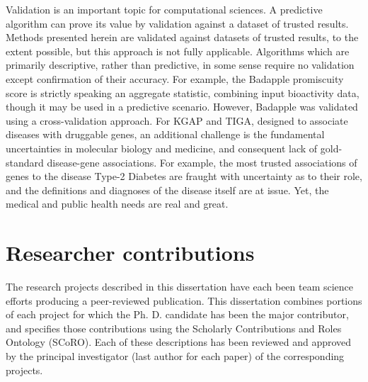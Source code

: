 Validation is an important topic for computational sciences. A predictive algorithm can prove its value by validation against a dataset of trusted results. Methods presented herein are validated against datasets of trusted results, to the extent possible, but this approach is not fully applicable. Algorithms which are primarily descriptive, rather than predictive, in some sense require no validation except confirmation of their accuracy. For example, the Badapple promiscuity score is strictly speaking an aggregate statistic, combining input bioactivity data, though it may be used in a predictive scenario. However, Badapple was validated using a cross-validation approach. For KGAP and TIGA, designed to associate diseases with druggable genes, an additional challenge is the fundamental uncertainties in molecular biology and medicine, and consequent lack of gold-standard disease-gene associations. For example, the most trusted associations of genes to the disease Type-2 Diabetes are fraught with uncertainty as to their role, and the definitions and diagnoses of the disease itself are at issue. Yet, the medical and public health needs are real and great. 

\section{Researcher contributions}

The research projects described in this dissertation have each been team science efforts producing a peer-reviewed publication. This dissertation combines portions of each project for which the Ph. D. candidate has been the major contributor, and specifies those contributions using the Scholarly Contributions and Roles Ontology (SCoRO)\cite{Shotton2020-ph}. Each of these descriptions has been reviewed and approved by the principal investigator (last author for each paper) of the corresponding projects. 
